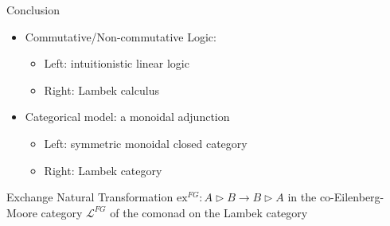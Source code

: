 \documentclass{beamer}
\begin{document}
\begin{frame}{Conclusion}

\begin{itemize}
\item Commutative/Non-commutative Logic:
      \begin{itemize}
      \item Left: intuitionistic linear logic
      \item Right: Lambek calculus
      \end{itemize}
\item Categorical model: a monoidal adjunction
      \begin{itemize}
      \item Left: symmetric monoidal closed category
      \item Right: Lambek category
      \end{itemize}
\end{itemize}

\begin{block}{Exchange Natural Transformation}
$\mathrm{ex}^{FG}:A\triangleright B\rightarrow B\triangleright A$ in the
co-Eilenberg-Moore category $\mathcal{L}^{FG}$ of the comonad on the Lambek
category
\end{block}

\end{frame}
\end{document}
